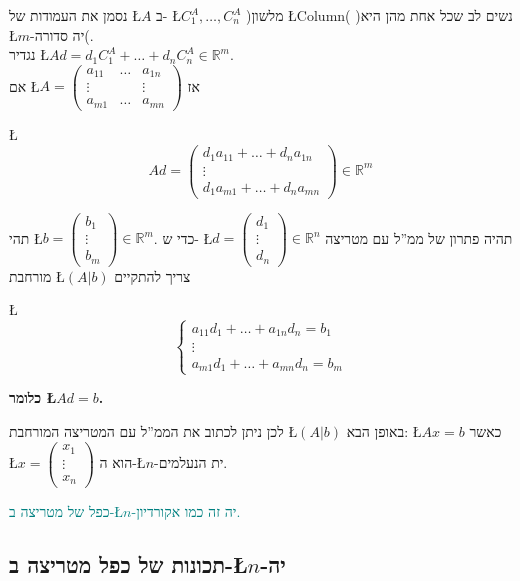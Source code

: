 \documentclass[english,hebrew]{article}
\begin{document}
נסמן את העמודות של \L{$A$} ב- \L{$C_{1}^{A},\dots,C_{n}^{A}$} )מלשון
\L{$\text{Column}$}( )נשים לב שכל אחת מהן היא \L{$m$}-יה סדורה(.\\

נגדיר \L{$Ad=d_{1}C_{1}^{A}+\dots+d_{n}C_{n}^{A}\in\mathbb{R}^{m}$}.\\

אם \L{$A=\begin{pmatrix}a_{11} & \dots & a_{1n}\\
\vdots &  & \vdots\\
a_{m1} & \dots & a_{mn}
\end{pmatrix}$} אז

\L{%
\[
Ad=\begin{pmatrix}d_{1}a_{11}+\dots+d_{n}a_{1n}\\
\vdots\\
d_{1}a_{m1}+\dots+d_{n}a_{mn}
\end{pmatrix}\in\mathbb{R}^{m}
\]
}%

\medskip{}

תהי \L{$b=\begin{pmatrix}b_{1}\\
\vdots\\
b_{m}
\end{pmatrix}\in\mathbb{R}^{m}$}. כדי ש- \L{$d=\begin{pmatrix}d_{1}\\
\vdots\\
d_{n}
\end{pmatrix}\in\mathbb{R}^{n}$} תהיה פתרון של ממ\textquotedblright ל עם מטריצה מורחבת \L{$(A|b)$}
צריך להתקיים

\L{%
\[
\begin{cases}
a_{11}d_{1}+\dots+a_{1n}d_{n}=b_{1}\\
\vdots\\
a_{m1}d_{1}+\dots+a_{mn}d_{n}=b_{m}
\end{cases}
\]
}%

\textbf{כלומר \L{$Ad=b$}.}

לכן ניתן לכתוב את הממ\textquotedblright ל עם המטריצה המורחבת \L{$(A|b)$}
באופן הבא: \L{$Ax=b$} כאשר \L{$x=\begin{pmatrix}x_{1}\\
\vdots\\
x_{n}
\end{pmatrix}$} הוא ה-\L{$n$}-ית הנעלמים.

\textcolor{teal}{כפל של מטריצה ב-\L{$n$}-יה זה כמו אקורדיון.}

\subsection{תכונות של כפל מטריצה ב-\L{$n$}-יה}
\end{document}
